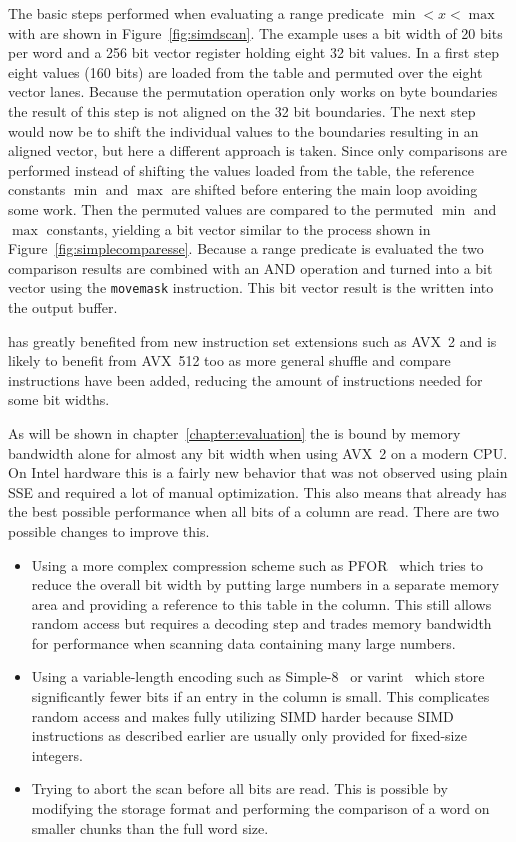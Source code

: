 The basic steps performed when evaluating a range predicate $\min < x < \max$
with \simdscan{} are shown in Figure~\ref{fig:simdscan}. The example uses a bit
width of 20 bits per word and a 256 bit vector register holding eight 32 bit
values.  In a first step eight values (160 bits) are loaded from the table and
permuted over the eight vector lanes. Because the permutation operation only
works on byte boundaries the result of this step is not aligned on the 32 bit
boundaries.  The next step would now be to shift the individual values to the
boundaries resulting in an aligned vector, but here a different approach is
taken. Since only comparisons are performed instead of shifting the values
loaded from the table, the reference constants $\min$ and $\max$ are shifted
before entering the main loop avoiding some work. Then the permuted values are
compared to the permuted $\min$ and $\max$ constants, yielding a bit vector
similar to the process shown in Figure~\ref{fig:simplecomparesse}. Because a
range predicate is evaluated the two comparison results are combined with an AND
operation and turned into a bit vector using the \texttt{movemask} instruction.
This bit vector result is the written into the output buffer.

\simdscan{} has greatly benefited from new instruction set extensions such as
AVX~2 \cite{AVX2-Scan} and is likely to benefit from AVX~512 too as more general
shuffle and compare instructions have been added, reducing the amount of
instructions needed for some bit widths.

As will be shown in chapter~\ref{chapter:evaluation} the \simdscan{} is bound by
memory bandwidth alone for almost any bit width when using AVX~2 on a modern
CPU. On Intel hardware this is a fairly new behavior that was not observed using
plain SSE \cite{AVX2-Scan} and required a lot of manual optimization. This also
means that \simdscan{} already has the best possible performance when all bits
of a column are read. There are two possible changes to improve this.

\begin{itemize}
  \item Using a more complex compression scheme such as PFOR~\cite{PFOR} which
    tries to reduce the overall bit width by putting large numbers in a separate
    memory area and providing a reference to this table in the column. This
    still allows random access but requires a decoding step and trades
    memory bandwidth for performance when scanning data containing many large
    numbers.
  \item Using a variable-length encoding such as Simple-8~\cite{Simple8} or
    varint~\cite{varint} which store significantly fewer bits if an entry in the
    column is small. This complicates random access and makes fully utilizing
    SIMD harder because SIMD instructions as described earlier are usually only
    provided for fixed-size integers.
  \item Trying to abort the scan before all bits are read. This is possible by
    modifying the storage format and performing the comparison of a word on
    smaller chunks than the full word size.
\end{itemize}

